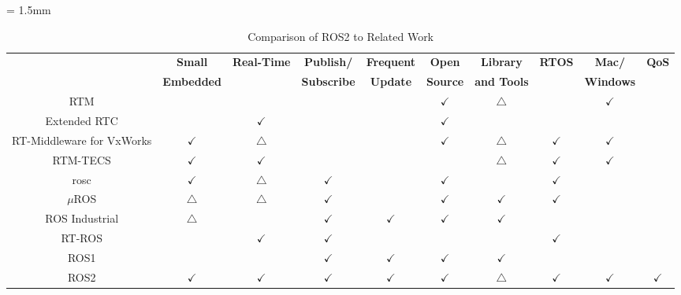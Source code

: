 \documentclass{sig-alternate-05-2015}
\begin{document}
\renewcommand{\arraystretch}{1.0}
\begin{table}[t]
  \caption{\label{tb:comparison}
    Comparison of ROS2 to Related Work}
  \centering
  \scriptsize	                    %
  \tabcolsep = 1.5mm              %
  \begin{tabular}{c|ccccccccc}
    \hline
    & \textbf{Small} & \textbf{Real-Time} & \textbf{Publish/} & \textbf{Frequent} & \textbf{Open} & \textbf{Library} & \textbf{RTOS} & \textbf{Mac/} & \textbf{QoS}\\
    & \textbf{Embedded} &  & \textbf{Subscribe} & \textbf{Update} & \textbf{Source} & \textbf{and Tools} &  & \textbf{Windows} & \\
    \hline
    \hline
    RTM \cite{ando2005rt} & & &  &  & \(\checkmark\) & \(\bigtriangleup\) & & \(\checkmark\) & \\
    Extended RTC \cite{chishiro2009extended} &  & \(\checkmark\) &  &  & \(\checkmark\) &  &  &  & \\
    RT-Middleware for VxWorks \cite{ikezoeopenrt} & \(\checkmark\) & \(\bigtriangleup\) &  &  & \(\checkmark\) & \(\bigtriangleup\) & \(\checkmark\) & \(\checkmark\) & \\
    RTM-TECS \cite{rtmtecs2016} & \(\checkmark\) & \(\checkmark\) &  &  &  & \(\bigtriangleup\) & \(\checkmark\) & \(\checkmark\) & \\
    rosc \cite{rosc@roscon2013} & \(\checkmark\) & \(\bigtriangleup\) & \(\checkmark\) &  & \(\checkmark\) &  & \(\checkmark\) &  & \\
    \(\mu\)ROS \cite{uros@roscon2013} & \(\bigtriangleup\) & \(\bigtriangleup\) & \(\checkmark\) &  & \(\checkmark\) & \(\checkmark\) & \(\checkmark\) &  & \\
    ROS Industrial \cite{rosindustrial} & \(\bigtriangleup\) &  & \(\checkmark\) & \(\checkmark\) & \(\checkmark\) & \(\checkmark\) &  &  & \\
    RT-ROS \cite{wei2015rt} &  & \(\checkmark\) & \(\checkmark\) &  &  &  & \(\checkmark\) &  & \\
    \hline
    ROS1 \cite{quigley2009ros} &  &  & \(\checkmark\) & \(\checkmark\) & \(\checkmark\) & \(\checkmark\) &  &  & \\
    ROS2 \cite{ros2_iccps2016} & \(\checkmark\) & \(\checkmark\) & \(\checkmark\) & \(\checkmark\) & \(\checkmark\) & \(\bigtriangleup\) & \(\checkmark\) & \(\checkmark\) & \(\checkmark\)\\
    \hline
  \end{tabular}
  \vspace{-5mm}
\end{table}
\end{document}
